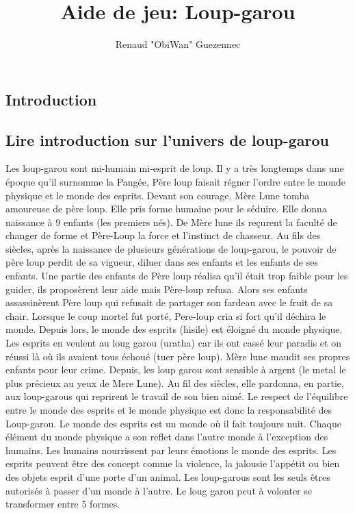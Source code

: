 \documentclass[oneside,12pt]{book}
\title{Aide de jeu: Loup-garou}
\author{Renaud "ObiWan" Guezennec}
\date{}
\begin{document}
\maketitle \clearpage
\tableofcontents \clearpage

\begin{flushleft}
    \chapter{Introduction}
        \section{Lire introduction sur l'univers de loup-garou}
       
         
Les loup-garou sont mi-humain mi-esprit de loup. 
Il y a très longtemps dans une époque qu'il surnomme la Pangée, Père loup faisait régner l'ordre entre le monde physique et le monde des esprits. 
Devant son courage, Mère Lune tomba amoureuse de père loup. 
Elle pris forme humaine pour le séduire. 
Elle donna naissance à 9 enfants (les premiers nés). 
De Mère lune ils reçurent la faculté de changer de forme et Père-Loup la force et l'instinct de chasseur. 
Au fils des siècles, après la naissance de plusieurs générations de loup-garou, le pouvoir de père loup perdit de sa vigueur, diluer dans ses enfants et les enfants de ses enfants. 
Une partie des enfants de Père loup réalisa qu'il était trop faible pour les guider, ils proposèrent leur aide mais Père-loup refusa. 
Alors ses enfants assassinèrent Père loup  qui refusait de partager son fardeau avec le fruit de sa chair. 
Lorsque le coup mortel fut porté, Pere-loup cria si fort qu'il déchira le monde. 
Depuis lors, le monde des esprits (hisile) est éloigné du monde physique. 
Les esprits en veulent au loug garou (uratha) car ils ont cassé leur paradis et on réussi là où ils avaient tous échoué (tuer père loup). 
Mère lune maudit ses propres enfants pour leur crime. 
Depuis, les loup garou sont sensible à argent (le metal le plus précieux au yeux de Mere Lune). 
Au fil des siècles, elle pardonna, en partie, aux loup-garous qui reprirent le travail de son bien aimé. 
Le respect de l'équilibre entre le monde des esprits et le monde physique est donc la responsabilité des Loup-garou. 
Le monde des esprits est un monde où il fait toujours nuit. 
Chaque élément du monde physique a son reflet dans l'autre monde à l'exception des humains. 
Les humains nourrissent par leurs émotions le monde des esprits. 
Les esprits peuvent être des concept comme la violence, la jalousie l'appétit ou bien des objets esprit d'une porte d'un animal. 
Les loup-garous sont les seuls êtres autorisés à passer d'un monde à l'autre. 
Le loug garou peut à volonter se transformer entre 5 formes.
 


\end{flushleft}
\end{document}
